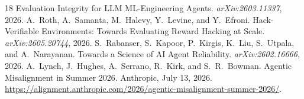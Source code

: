 \documentclass[11pt]{article}
\begin{document}
\begin{thebibliography}{18}
Evaluation Integrity for LLM ML-Engineering Agents. \emph{arXiv:2603.11337}, 2026.
 A.~Roth, A.~Samanta, M.~Halevy, Y.~Levine, and Y.~Efroni.
Hack-Verifiable Environments: Towards Evaluating Reward Hacking at Scale. \emph{arXiv:2605.20744}, 2026.
 S.~Rabanser, S.~Kapoor, P.~Kirgis, K.~Liu, S.~Utpala, and
A.~Narayanan. Towards a Science of AI Agent Reliability. \emph{arXiv:2602.16666}, 2026.
 A.~Lynch, J.~Hughes, A.~Serrano, R.~Kirk, and S.~R.~Bowman. Agentic
Misalignment in Summer 2026. Anthropic, July 13, 2026.
\url{https://alignment.anthropic.com/2026/agentic-misalignment-summer-2026/}.
\end{thebibliography}
\end{document}
